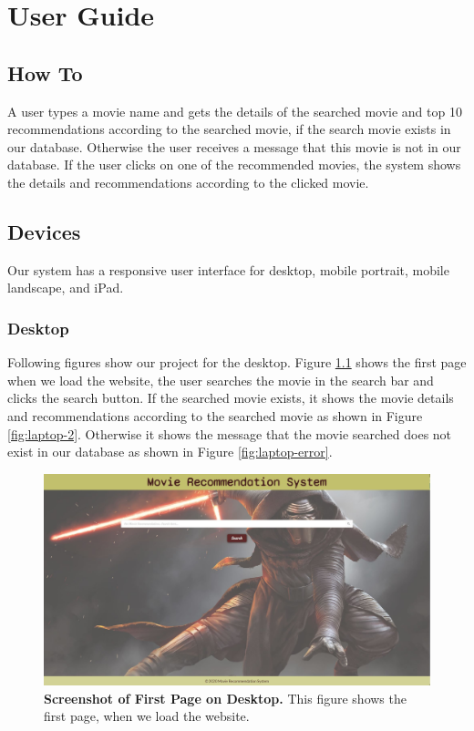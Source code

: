 \chapter{User Guide}
\label{ch:user}

\section{How To}

A user types a movie name and gets the details of the searched movie and top 10 recommendations according to the searched movie, if the search movie exists in our database. Otherwise the user receives a message that this movie is not in our database. If the user clicks on one of the recommended movies, the system shows the details and recommendations according to the clicked movie.

\section{Devices}

Our system has a responsive user interface for desktop, mobile portrait, mobile landscape, and iPad.

\subsection{Desktop}

Following figures show our project for the desktop. Figure \ref{fig:laptop-1} shows the first page when we load the website, the user searches the movie in the search bar and clicks the search button. If the searched movie exists, it shows the movie details and recommendations according to the searched movie as shown in Figure \ref{fig:laptop-2}. Otherwise it shows the message that the movie searched does not exist in our database as shown in Figure \ref{fig:laptop-error}.

\begin{figure}[ht]
	\centering
  	\includegraphics[width=1.0\textwidth]{images/laptop_1.JPG}
	\caption{\textbf{Screenshot of First Page on Desktop.} This figure shows the first page, when we load the website.}
  	\label{fig:laptop-1}
\end{figure}

